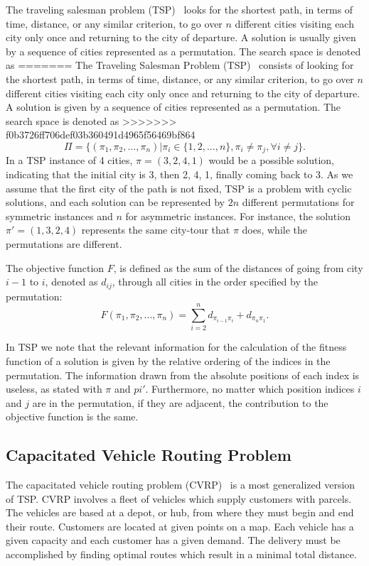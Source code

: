 The traveling salesman problem (TSP)~\citep{goldberg1985alleles} looks for the shortest path, in terms of time, distance, or any similar criterion, to go over $n$ different cities visiting each city only once and returning to the city of departure. A solution is usually given by a sequence of cities represented as a permutation. The search space is denoted as
=======
The Traveling Salesman Problem (TSP)~\citep{goldberg1985alleles} consists of looking for the shortest path, in terms of time, distance, or any similar criterion, to go over $n$ different cities visiting each city only once and returning to the city of departure. A solution is given by a sequence of cities represented as a permutation. The search space is denoted as
>>>>>>> f0b3726ff706def03b360491d4965f56469bf864
\begin{equation*}
	\Pi = \{ (\pi_1, \pi_2,...,\pi_n) | \pi_i \in \{ 1,2,...,n \}, \pi_i \neq \pi_j, \forall i \neq j \}\text{.}
\end{equation*}
In a TSP instance of 4 cities, $\pi = (3,2,4,1)$ would be a possible solution, indicating that the initial city is 3, then 2, 4, 1, finally coming back to 3. As we assume that the first city of the path is not fixed, TSP is a problem with cyclic solutions, and each solution can be represented by $2n$ different permutations for symmetric instances and $n$ for asymmetric instances. For instance, the solution ${\pi}'=(1,3,2,4)$ represents the same city-tour that $\pi$ does, while the permutations are different.

The objective function $F$, is defined as the sum of the distances of going from city $i-1$ to $i$, denoted as $d_{ij}$, through all cities in the order specified by the permutation:
\begin{equation*}
	F(\pi_1, \pi_2, ... , \pi_n) = \sum_{i=2}^{n}{d_{\pi_{i-1}\pi_i}} + d_{\pi_n\pi_1} \text{.}
\end{equation*}

In TSP we note that the relevant information for the calculation of the fitness function of a solution is given by the relative ordering of the indices in the permutation. The information drawn from the absolute positions of each index is useless, as stated with $\pi$ and ${pi}'$. Furthermore, no matter which position indices $i$ and $j$ are in the permutation, if they are adjacent, the contribution to the objective function is the same.

\subsection{Capacitated Vehicle Routing Problem}
\label{section:cvrp}
The capacitated vehicle routing problem (CVRP)~\citep{toth2001vehicle} is a most generalized version of TSP. CVRP involves a fleet of vehicles which supply customers with parcels. The vehicles are based at a depot, or hub, from where they must begin and end their route. Customers are located at given points on a map. Each vehicle has a given capacity and each customer has a given demand. The delivery must be accomplished by finding optimal routes which result in a minimal total distance.

